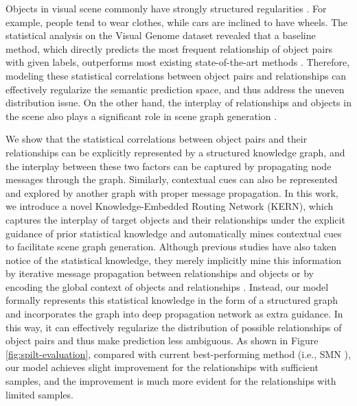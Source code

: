 \documentclass[10pt,twocolumn,letterpaper]{article}
\begin{document}
Objects in visual scene commonly have strongly structured regularities \cite{zellers2017neural}. For example, people tend to wear clothes, while cars are inclined to have wheels. The statistical analysis \cite{zellers2017neural} on the Visual Genome dataset \cite{krishna2017visual} revealed that a baseline method, which directly predicts the most frequent relationship of object pairs with given labels, outperforms most existing state-of-the-art methods \cite{newell2017pixels,xu2017scene}. Therefore, modeling these statistical correlations between object pairs and relationships can effectively regularize the semantic prediction space, and thus address the uneven distribution issue. On the other hand, the interplay of relationships and objects in the scene also plays a significant role in scene graph generation \cite{xu2017scene}. 

We show that the statistical correlations between object pairs and their relationships can be explicitly represented by a structured knowledge graph, and the interplay between these two factors can be captured by propagating node messages through the graph. Similarly, contextual cues can also be represented and explored by another graph with proper message propagation. In this work, we introduce a novel Knowledge-Embedded Routing Network (KERN), which captures the interplay of target objects and their relationships under the explicit guidance of prior statistical knowledge and automatically mines contextual cues to facilitate scene graph generation. Although previous studies \cite{dai2017detecting,zellers2017neural} have also taken notice of the statistical knowledge, they merely implicitly mine this information by iterative message propagation between relationships and objects \cite{xu2017scene} or by encoding the global context of objects and relationships \cite{zellers2017neural}. Instead, our model formally represents this statistical knowledge in the form of a structured graph and incorporates the graph into deep propagation network as extra guidance. In this way, it can effectively regularize the distribution of possible relationships of object pairs and thus make prediction less ambiguous. As shown in Figure \ref{fig:spilt-evaluation}, compared with current best-performing method (i.e., SMN \cite{zellers2017neural}), our model achieves slight improvement for the relationships with sufficient samples, and the improvement is much more evident for the relationships with limited samples.
\end{document}
